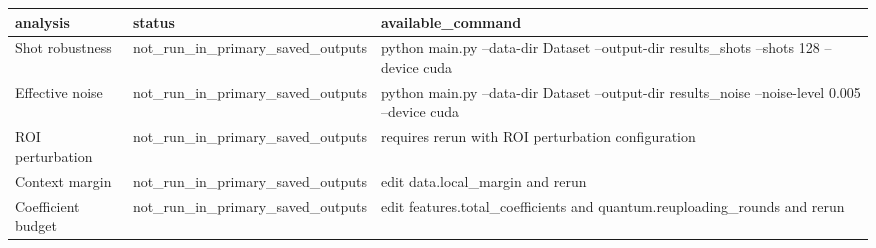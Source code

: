 \begin{tabular}{lll}
\toprule
analysis & status & available_command \\
\midrule
Shot robustness & not_run_in_primary_saved_outputs & python main.py --data-dir Dataset --output-dir results_shots --shots 128 --device cuda \\
Effective noise & not_run_in_primary_saved_outputs & python main.py --data-dir Dataset --output-dir results_noise --noise-level 0.005 --device cuda \\
ROI perturbation & not_run_in_primary_saved_outputs & requires rerun with ROI perturbation configuration \\
Context margin & not_run_in_primary_saved_outputs & edit data.local_margin and rerun \\
Coefficient budget & not_run_in_primary_saved_outputs & edit features.total_coefficients and quantum.reuploading_rounds and rerun \\
\bottomrule
\end{tabular}
